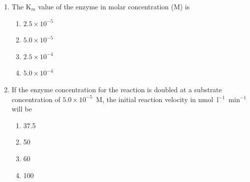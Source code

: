 \documentclass[journal,12pt,onecolumn]{IEEEtran}
\theoremstyle{remark}
\begin{document}
\begin{enumerate}
\item The K$_m$ value of the enzyme in molar concentration (M) is

\begin{multicols}{2}
\begin{enumerate}
    \item $2.5 \times 10^{-5}$
    \item $5.0 \times 10^{-5}$
    \item $2.5 \times 10^{-4}$
    \item $5.0 \times 10^{-4}$
\end{enumerate}
\end{multicols}

\item If the enzyme concentration for the reaction is doubled at a substrate concentration of $5.0\times10^{-5}$~M, the initial reaction velocity in nmol~l$^{-1}$~min$^{-1}$ will be

\begin{multicols}{2}
\begin{enumerate}
    \item 37.5
    \item 50
    \item 60
    \item 100
\end{enumerate}
\end{multicols}
\end{enumerate}

    
\end{document}
